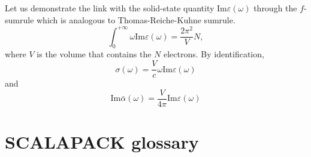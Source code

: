 \documentclass[aps,prb,reprint,showpacs]{revtex4-1}
\begin{document}
Let us demonstrate the link with the solid-state quantity $\mathrm{Im} \varepsilon(\omega)$
through the $f$-sumrule which is analogous to Thomas-Reiche-Kuhne sumrule.
\begin{equation}
 \int_0^{+\infty} \omega \mathrm{Im}\varepsilon(\omega) = \frac{2\pi^2}{V} N ,
\end{equation}
where $V$ is the volume that contains the $N$ electrons.
By identification, 
\begin{equation}
 \sigma(\omega) = \frac{V}{c} \omega \mathrm{Im}\varepsilon(\omega)
\end{equation}
and
\begin{equation}
 \mathrm{Im} \bar\alpha(\omega) = \frac{V}{4\pi} \mathrm{Im}\varepsilon(\omega)
\end{equation}








\appendix

\section{SCALAPACK glossary}
\end{document}
